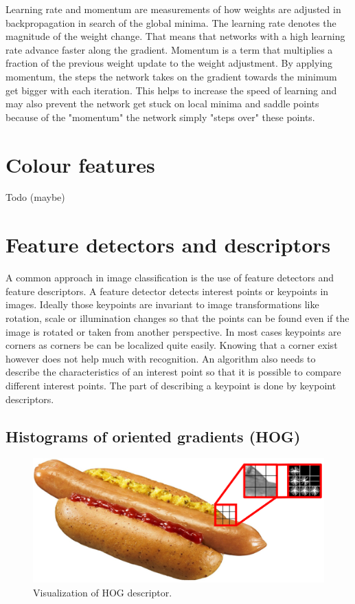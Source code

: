 Learning rate and momentum are measurements of how weights are adjusted in backpropagation in search of the global minima. The learning rate denotes the magnitude of the weight change. That means that networks with a high learning rate advance faster along the gradient. Momentum is a term that multiplies a fraction of the previous weight update to the weight adjustment. By applying momentum, the steps the network takes on the gradient towards the minimum get bigger with each iteration. This helps to increase the speed of learning and may also prevent the network get stuck on local minima and saddle points because of the "momentum" the network simply "steps over" these points.

\section{Colour features}
\label{sec:theory_colour}
Todo {(maybe)}




\section{Feature detectors and descriptors}
A common approach in image classification is the use of feature detectors and feature descriptors. A feature detector detects interest points or keypoints in images. Ideally those keypoints are invariant to image transformations like rotation, scale or illumination changes so that the points can be found even if the image is rotated or taken from another perspective. In most cases keypoints are corners as corners be can be localized quite easily. Knowing that a corner exist however does not help much with recognition. An algorithm also needs to describe the characteristics of an interest point so that it is possible to compare different interest points. The part of describing a keypoint is done by keypoint descriptors.

\subsection[HOG]{Histograms of oriented gradients (HOG)}
\begin{figure}
	\centering
	\includegraphics[scale=0.45]{data/images/theory/theoryHOG_VisualizationGradients}
	\caption{Visualization of HOG descriptor.}
	\label{fig:hogVisualization}
\end{figure}

